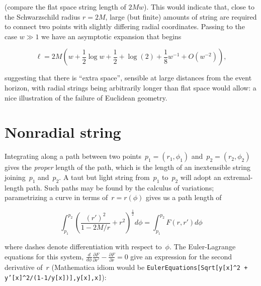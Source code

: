 \documentclass{ws-tpe}
\begin{document}
(compare the flat space string length of $2Mw$).  This would indicate
 that, close to the Schwarzschild radius $r=2M$, large (but finite)
 amounts of string are required to connect two points with slightly
 differing radial coordinates.  Passing to the case $w\gg 1$ we have
 an asymptotic expansion that begins

% 
\begin{equation}\label{asymptotic_ell}
  \ell = 2M\left(w +  \frac{1}{2}\log w + \frac{1}{2} + \log(2)  +  \frac{1}{8}w^{-1} + O(w^{-2})\right),
\end{equation}

\noindent suggesting that there is ``extra space'', sensible at large
distances from the event horizon, with radial strings being
arbitrarily longer than flat space would allow: a nice illustration of
the failure of Euclidean geometry.

\section{Nonradial string}
Integrating along a path between two
points~$p_1=\left(r_1,\phi_1\right)$ and~$p_2=\left(r_2,\phi_2\right)$
gives the {\em proper} length of the path, which is the length of an
inextensible string joining~$p_1$ and~$p_2$.  A taut but light string
from~$p_1$ to~$p_2$ will adopt an extremal-length path.  Such paths
may be found by the calculus of variations; parametrizing a curve in
terms of~$r=r\left(\phi\right)$ gives us a path length of


\begin{equation}
  \int_{p_1}^{p_2}\left(\frac{\left(r'\right)^2}{1-2M/r} + r^2\right)^\frac{1}{2}d\phi=
  \int_{p_1}^{p_2}F\left(r,r'\right)d\phi
\end{equation}

\noindent where dashes denote differentiation with respect to~$\phi$.
The Euler-Lagrange equations for this system,
$\frac{d}{d\phi}\frac{\partial F}{\partial r'}-\frac{\partial
  F}{\partial r}=0$ give an expression for the second derivative
of~$r$ (Mathematica idiom would be {\tt EulerEquations[Sqrt[y[x]\^{}2
      + y'[x]\^{}2/(1-1/y[x])],y[x],x]}):
\end{document}
